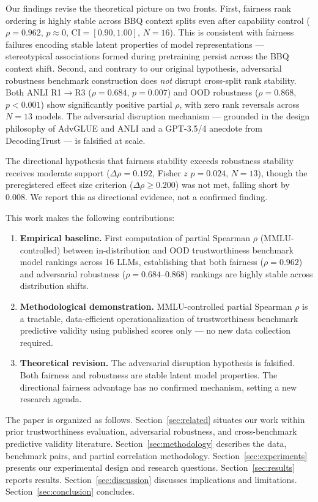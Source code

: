 Our findings revise the theoretical picture on two fronts. First, fairness rank ordering is highly stable across BBQ context splits even after capability control ($\rho = 0.962$, $p \approx 0$, CI$=[0.90, 1.00]$, $N=16$). This is consistent with fairness failures encoding stable latent properties of model representations --- stereotypical associations formed during pretraining persist across the BBQ context shift. Second, and contrary to our original hypothesis, adversarial robustness benchmark construction does \emph{not} disrupt cross-split rank stability. Both ANLI R1$\rightarrow$R3 ($\rho = 0.684$, $p = 0.007$) and OOD robustness ($\rho = 0.868$, $p < 0.001$) show significantly positive partial $\rho$, with zero rank reversals across $N=13$ models. The adversarial disruption mechanism --- grounded in the design philosophy of AdvGLUE and ANLI and a GPT-3.5/4 anecdote from DecodingTrust \citep{Wang2023DecodingTrust} --- is falsified at scale.

The directional hypothesis that fairness stability exceeds robustness stability receives moderate support ($\Delta\rho = 0.192$, Fisher $z$ $p = 0.024$, $N=13$), though the preregistered effect size criterion ($\Delta\rho \geq 0.200$) was not met, falling short by 0.008. We report this as directional evidence, not a confirmed finding.

This work makes the following contributions:

\begin{enumerate}
\item \textbf{Empirical baseline.} First computation of partial Spearman $\rho$ (MMLU-controlled) between in-distribution and OOD trustworthiness benchmark model rankings across 16 LLMs, establishing that both fairness ($\rho = 0.962$) and adversarial robustness ($\rho = 0.684$--$0.868$) rankings are highly stable across distribution shifts.

\item \textbf{Methodological demonstration.} MMLU-controlled partial Spearman $\rho$ is a tractable, data-efficient operationalization of trustworthiness benchmark predictive validity using published scores only --- no new data collection required.

\item \textbf{Theoretical revision.} The adversarial disruption hypothesis is falsified. Both fairness and robustness are stable latent model properties. The directional fairness advantage has no confirmed mechanism, setting a new research agenda.
\end{enumerate}

The paper is organized as follows. Section~\ref{sec:related} situates our work within prior trustworthiness evaluation, adversarial robustness, and cross-benchmark predictive validity literature. Section~\ref{sec:methodology} describes the data, benchmark pairs, and partial correlation methodology. Section~\ref{sec:experiments} presents our experimental design and research questions. Section~\ref{sec:results} reports results. Section~\ref{sec:discussion} discusses implications and limitations. Section~\ref{sec:conclusion} concludes.
